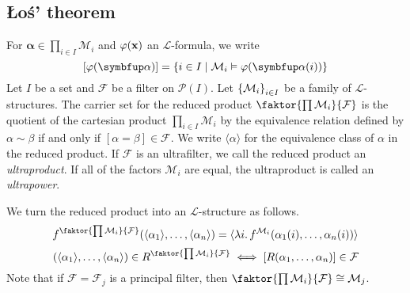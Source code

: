 \subsection{\L{}o\'s' theorem}
For \( \bm \alpha \in \prod_{i \in I} \mathcal M_i \) and \( \varphi(\vb x) \) an \( \mathcal L \)-formula, we write
\[ [\varphi(\bm \alpha)] = \qty{i \in I \mid \mathcal M_i \vDash \varphi(\bm \alpha(i))} \]
Let \( I \) be a set and \( \mathcal F \) be a filter on \( \mathcal P(I) \).
Let \( \qty{\mathcal M_i}_{i \in I} \) be a family of \( \mathcal L \)-structures.
The carrier set for the reduced product \( \faktor{\prod \mathcal M_i}{\mathcal F} \) is the quotient of the cartesian product \( \prod_{i \in I} \mathcal M_i \) by the equivalence relation defined by \( \alpha \sim \beta \) if and only if \( [\alpha = \beta] \in \mathcal F \).
We write \( \langle \alpha \rangle \) for the equivalence class of \( \alpha \) in the reduced product.
If \( \mathcal F \) is an ultrafilter, we call the reduced product an \emph{ultraproduct}.
If all of the factors \( \mathcal M_i \) are equal, the ultraproduct is called an \emph{ultrapower}.

We turn the reduced product into an \( \mathcal L \)-structure as follows.
\[ f^{\faktor{\prod \mathcal M_i}{\mathcal F}}(\langle \alpha_1 \rangle, \dots, \langle \alpha_n \rangle) = \langle \lambda i.\, f^{\mathcal M_i}(\alpha_1(i), \dots, \alpha_n(i)) \rangle \]
\[ (\langle \alpha_1 \rangle, \dots, \langle \alpha_n \rangle) \in R^{\faktor{\prod \mathcal M_i}{\mathcal F}} \iff [R(\alpha_1, \dots, \alpha_n)] \in \mathcal F \]
Note that if \( \mathcal F = \mathcal F_j \) is a principal filter, then \( \faktor{\prod \mathcal M_i}{\mathcal F} \cong \mathcal M_j \).

